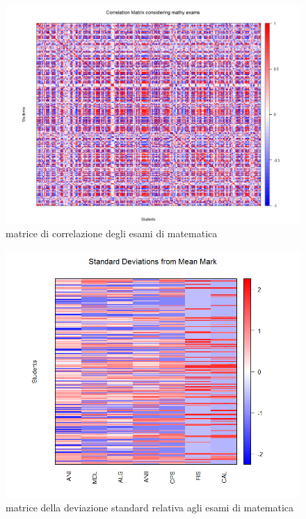                 \begin{figure}
                    \centering
                    \caption{matrice di correlazione degli esami di matematica}
                    \label{esami_mat_corr}
                	\includegraphics[scale=0.32]{img/corr_matrix_3.png}
                \end{figure}

                \begin{figure}
                    \centering
                    \caption{matrice della deviazione standard relativa agli esami di matematica}
                    \label{esami_mat_stddev}
                	\includegraphics[scale=0.32]{img/std_dev_matrix_3.png}
                \end{figure}

